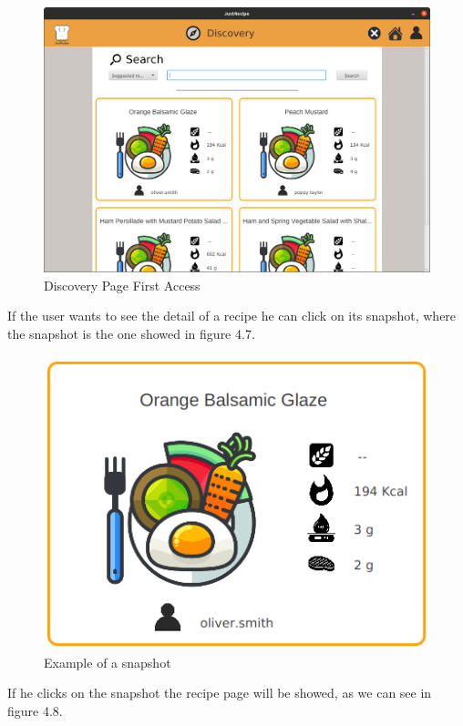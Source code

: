 \documentclass[a4paper]{report}
\begin{document}
\begin{figure}[htpb]
	\centering
	\includegraphics[scale=0.25]{img/user_manual/first-discovery.png}
	\caption{Discovery Page First Access}
\end{figure}

\noindent If the user wants to see the detail of a recipe he can click on its snapshot, where the snapshot is the one showed in figure 4.7.

\begin{figure}[htpb]
	\centering
	\includegraphics[scale=0.35]{img/user_manual/snap.png}
	\caption{Example of a snapshot}
\end{figure}

\noindent If he clicks on the snapshot the recipe page will be showed, as we can see in figure 4.8.
\end{document}

